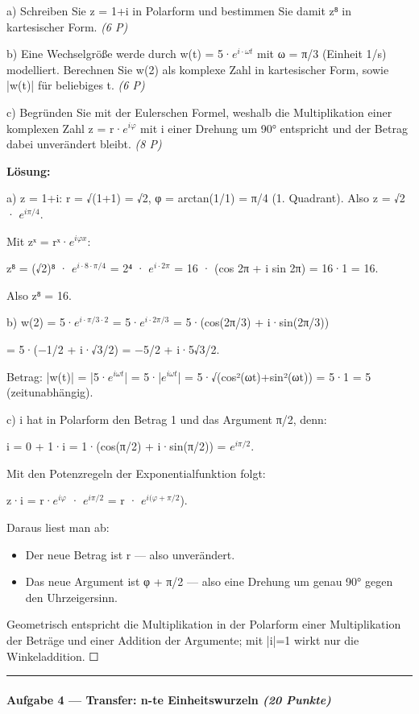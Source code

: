 \documentclass[11pt, a4paper]{article}
\begin{document}
a) Schreiben Sie z = 1+i in Polarform und bestimmen Sie damit z⁸ in kartesischer Form. \textit{(6 P)}


b) Eine Wechselgröße werde durch w(t) = 5·$e^{i·ωt}$ mit ω = π/3 (Einheit 1/s) modelliert. Berechnen Sie w(2) als komplexe Zahl in kartesischer Form, sowie |w(t)| für beliebiges t. \textit{(6 P)}


c) Begründen Sie mit der Eulerschen Formel, weshalb die Multiplikation einer komplexen Zahl z = r·$e^{iφ}$ mit i einer Drehung um 90° entspricht und der Betrag dabei unverändert bleibt. \textit{(8 P)}


\textbf{Lösung:}


a) z = 1+i: r = √(1+1) = √2, φ = arctan(1/1) = π/4 (1. Quadrant). Also z = √2 · $e^{iπ/4}$.


Mit zˣ = rˣ·$e^{iφx}$:

z⁸ = (√2)⁸ · $e^{i·8·π/4}$ = 2⁴ · $e^{i·2π}$ = 16 · (cos 2π + i sin 2π) = 16·1 = 16.


Also z⁸ = 16.


b) w(2) = 5·$e^{i·π/3·2}$ = 5·$e^{i·2π/3}$ = 5·(cos(2π/3) + i·sin(2π/3))

= 5·(−1/2 + i·√3/2) = −5/2 + i·5√3/2.


Betrag: |w(t)| = |5·$e^{iωt}$| = 5·|$e^{iωt}$| = 5·√(cos²(ωt)+sin²(ωt)) = 5·1 = 5 (zeitunabhängig).


c) i hat in Polarform den Betrag 1 und das Argument π/2, denn:

i = 0 + 1·i = 1·(cos(π/2) + i·sin(π/2)) = $e^{iπ/2}$.


Mit den Potenzregeln der Exponentialfunktion folgt:

z·i = r·$e^{iφ}$ · $e^{iπ/2}$ = r · $e^{i(φ+π/2}$).


Daraus liest man ab:

\begin{itemize}
  \item Der neue Betrag ist r — also unverändert.
  \item Das neue Argument ist φ + π/2 — also eine Drehung um genau 90° gegen den Uhrzeigersinn.
\end{itemize}

Geometrisch entspricht die Multiplikation in der Polarform einer Multiplikation der Beträge und einer Addition der Argumente; mit |i|=1 wirkt nur die Winkeladdition. ☐



\noindent\textcolor{rulegray}{\rule{\linewidth}{0.4pt}}


\paragraph{Aufgabe 4 — Transfer: n-te Einheitswurzeln \textit{(20 Punkte)}}\mbox{}\\[2pt]
\end{document}
